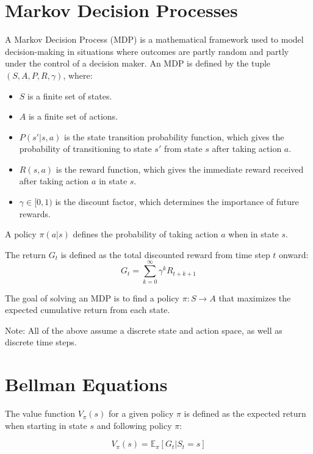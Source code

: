 \documentclass{article}
\begin{document}
\section{Markov Decision Processes}
\quad A Markov Decision Process (MDP) is a mathematical framework used to model decision-making in situations where outcomes are partly random and partly under the control of a decision maker. An MDP is
defined by the tuple \( (S, A, P, R, \gamma) \), where:
\begin{itemize}
    \item \( S \) is a finite set of states.
    \item \( A \) is a finite set of actions.
    \item \( P(s' | s, a) \) is the state transition probability function, which gives the probability of transitioning to state \( s' \) from state \( s \) after taking action \( a \).
    \item \( R(s, a) \) is the reward function, which gives the immediate reward received after taking action \( a \) in state \( s \).
    \item \( \gamma \in [0, 1) \) is the discount factor, which determines the importance of future rewards.
\end{itemize}

A policy \( \pi(a | s) \) defines the probability of taking action \( a \) when in state \( s \).

The return \( G_t \) is defined as the total discounted reward from time step \( t \) onward:
\begin{equation}
G_t = \sum_{k=0}^{\infty} \gamma^k R_{t+k+1}
\end{equation}

The goal of solving an MDP is to find a policy \( \pi: S \rightarrow A \) that maximizes the expected cumulative return from each state.

Note: All of the above assume a discrete state and action space, as well as discrete time steps.

\section{Bellman Equations}

The value function \( V_\pi(s) \) for a given policy \( \pi \) is defined as the expected return when starting in state \( s \) and following policy \( \pi \):

\begin{equation}
V_\pi(s) = \mathbb{E}_\pi [G_t | S_t = s]
\end{equation}
\end{document}

